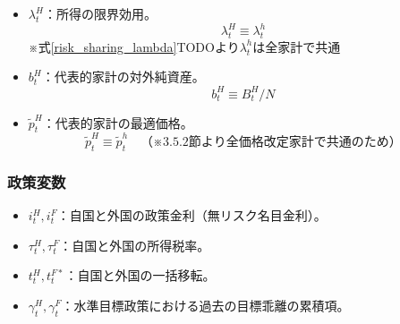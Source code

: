 \begin{itemize}
\begin{equation}
        \label{form:chapter3_definitions_variables_endogenous_representative_y_H_def}
            y_t^H\equiv Y_t^H/N
        \end{equation}
    \item
    \label{itm:chapter3_definitions_variables_endogenous_representative_lambda_H}
        \(\lambda_t^H\)：所得の限界効用。
        \begin{equation}
        \label{form:chapter3_definitions_variables_endogenous_representative_lambda_H_def}
            \lambda_t^H\equiv\lambda_t^h
        \end{equation}
        ※式\eqref{risk_sharing_lambda}TODOより\(\lambda_t^h\)は全家計で共通
    \item
    \label{itm:chapter3_definitions_variables_endogenous_representative_b_H}
        \(b_t^H\)：代表的家計の対外純資産。
        \begin{equation}
        \label{form:chapter3_definitions_variables_endogenous_representative_b_H_def}
            b_t^H\equiv B_t^H/N
        \end{equation}
    \item
    \label{itm:chapter3_definitions_variables_endogenous_representative_p_H_tilde}
        \(\widetilde{p}_t^H\)：代表的家計の最適価格。
        \begin{equation}
        \label{form:chapter3_definitions_variables_endogenous_representative_p_H_tilde_def}
            \widetilde{p}_t^H\equiv\widetilde{p}_t^h\quad（※3.5.2節より全価格改定家計で共通のため）
        \end{equation}
\end{itemize}
\subsubsection*{政策変数}
\label{sec:chapter3_definitions_variables_endogenous_policy}
\begin{itemize}
    \item
    \label{itm:chapter3_definitions_variables_endogenous_policy_i}
        \(i_t^H,i_t^F\)：自国と外国の政策金利（無リスク名目金利）。
    \item
    \label{itm:chapter3_definitions_variables_endogenous_policy_tau}
        \(\tau_t^H,\tau_t^F\)：自国と外国の所得税率。
    \item
    \label{itm:chapter3_definitions_variables_endogenous_policy_t}
        \(t_t^H,t_t^{F*}\)：自国と外国の一括移転。
    \item
    \label{itm:chapter3_definitions_variables_endogenous_policy_gamma}
        \(\gamma_t^H,\gamma_t^F\)：水準目標政策における過去の目標乖離の累積項。
\end{itemize}

